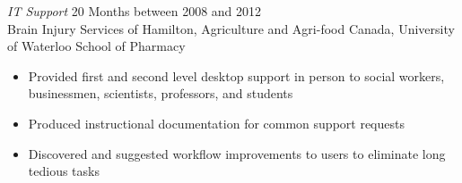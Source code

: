 \documentclass{res}
\newcommand{\inEnglish}[1]{#1}
\begin{document}
\begin{resume}
\inEnglish{
	{\sl IT Support}
		\hfill 20 Months between 2008 and 2012 \\
	Brain Injury Services of Hamilton, Agriculture and Agri-food Canada, University of Waterloo School of Pharmacy

	\vspace{0.05in}
	\begin{itemize} \itemsep -2pt
		\item Provided first and second level desktop support in person to social workers, businessmen, scientists, professors, and students
		\item Produced instructional documentation for common support requests
		\item Discovered and suggested workflow improvements to users to eliminate long tedious tasks
	\end{itemize}



}

\vspace{0.1in}

\end{resume}
\end{document}
